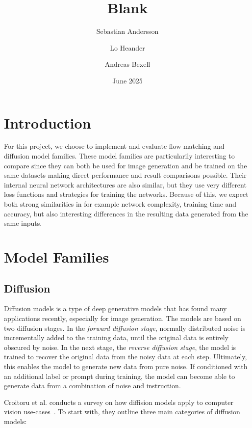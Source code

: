 \documentclass{article}
\title{Blank}
\author{Sebastian Andersson \and Lo Heander \and Andreas Bexell}
\date{June 2025}
\begin{document}
\maketitle

\section{Introduction}

For this project, we choose to implement and evaluate flow matching and diffusion model families. These model families are particularily interesting to compare since they can both be used for image generation and be trained on the same datasets making direct performance and result comparisons possible. Their internal neural network architectures are also similar, but they use very different loss functions and strategies for training the networks. Because of this, we expect both strong similarities in for example network complexity, training time and accuracy, but also interesting differences in the resulting data generated from the same inputs.

\section{Model Families}

\subsection{Diffusion}

Diffusion models is a type of deep generative models that has found many applications recently, especially for image generation. The models are based on two diffusion stages. In the \emph{forward diffusion stage}, normally distributed noise is incrementally added to the training data, until the original data is entirely obscured by noise. In the next stage, the \emph{reverse diffusion stage}, the model is trained to recover the original data from the noisy data at each step. Ultimately, this enables the model to generate new data from pure noise. If conditioned with an additional label or prompt during training, the model can become able to generate data from a combination of noise and instruction. \cite{croitoru2023diffusion, yang2023diffusion}

Croitoru et al. conducts a survey on how diffision models apply to computer vision use-cases~\cite{croitoru2023diffusion}. To start with, they outline three main categories of diffusion models:
\end{document}
